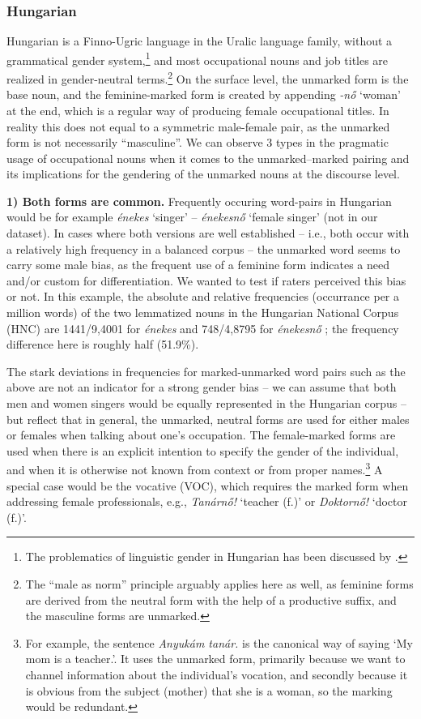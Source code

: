 \documentclass[11pt]{article}
\begin{document}
\subsubsection{Hungarian}

Hungarian is a Finno-Ugric language in the Uralic language family, without a grammatical gender system,\footnote{The problematics of linguistic gender in Hungarian has been discussed by \citet{vasvari_2014_problemas}.} and most occupational nouns and job titles are realized in gender-neutral terms.\footnote{The ``male as norm'' principle arguably applies here as well, as feminine forms are derived from the neutral form with the help of a productive suffix, and the masculine forms are unmarked.}
On the surface level, the unmarked form is the base noun, and the feminine-marked form is created by appending \textit{-nő} `woman' at the end, which is a regular way of producing female occupational titles. In reality this does not equal to a symmetric male-female pair, as the unmarked form is not necessarily ``masculine''. We can observe 3 types in the pragmatic usage of occupational nouns when it comes to the unmarked--marked pairing and its implications for the gendering of the unmarked nouns at the discourse level.

\textbf{1) Both forms are common.} Frequently occuring word-pairs in Hungarian would be for example \textit{énekes} `singer' -- \textit{énekesnő} `female singer' (not in our dataset). In cases where both versions are well established -- i.e., both occur with a relatively high frequency in a balanced corpus -- the unmarked word seems to carry some male bias, as the frequent use of a feminine form indicates a need and/or custom for differentiation. We wanted to test if raters perceived this bias or not. In this example, the absolute and relative frequencies (occurrance per a million words) of the two lemmatized nouns in the Hungarian National Corpus (HNC) are 1441/9,4001 for \textit{énekes} and 748/4,8795 for \textit{énekesnő} \citep{varadi_2002_hungarian, oravecz_2014_hungarian}; the frequency difference here is roughly half (51.9\%).

The stark deviations in frequencies for marked-unmarked word pairs such as the above are not an indicator for a strong gender bias -- we can assume that both men and women singers would be equally represented in the Hungarian corpus -- but reflect that in general, the unmarked, neutral forms are used for either males or females when talking about one's occupation. The female-marked forms are used when there is an explicit intention to specify the gender of the individual, and when it is otherwise not known from context or from proper names.\footnote{For example, the sentence \textit{Anyukám tanár.} is the canonical way of saying `My mom is a teacher.'. It uses the unmarked form, primarily because we want to channel information about the individual's vocation, and secondly because it is obvious from the subject (mother) that she is a woman, so the marking would be redundant.} A special case would be the vocative (VOC), which requires the marked form when addressing female professionals, e.g., \textit{Tanárnő!} `teacher (f.)' or \textit{Doktornő!} `doctor (f.)'.
\end{document}
